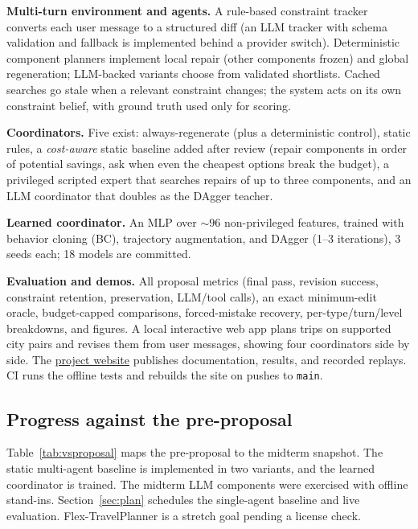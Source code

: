 \documentclass{article}
\begin{document}
\textbf{Multi-turn environment and agents.} A rule-based constraint tracker
converts each user message to a structured diff (an LLM tracker with schema
validation and fallback is implemented behind a provider switch).
Deterministic component planners implement local repair (other components
frozen) and global regeneration; LLM-backed variants choose from validated
shortlists. Cached searches go stale when a relevant constraint changes; the
system acts on its own constraint belief, with ground truth used only for
scoring.

\textbf{Coordinators.} Five exist: always-regenerate (plus a deterministic
control), static rules, a \emph{cost-aware} static baseline added after
review (repair components in order of potential savings, ask when even the
cheapest options break the budget), a privileged scripted expert that
searches repairs of up to three components, and an LLM coordinator that
doubles as the DAgger teacher.

\textbf{Learned coordinator.} An MLP over ${\sim}96$ non-privileged
features, trained with behavior cloning (BC), trajectory augmentation, and
DAgger (1--3 iterations), 3 seeds each; 18 models are committed.

\textbf{Evaluation and demos.} All proposal metrics (final pass, revision
success, constraint retention, preservation, LLM/tool calls), an exact
minimum-edit oracle, budget-capped comparisons, forced-mistake recovery,
per-type/turn/level breakdowns, and figures. A local interactive web app
plans trips on supported city pairs and revises them from user messages,
showing four coordinators side by side. The
\href{https://onetrickollie.github.io/taskflow-travel/}{project website}
publishes documentation, results, and recorded replays. CI runs the
offline tests and rebuilds the site on pushes to \texttt{main}.

\subsection{Progress against the pre-proposal}
Table~\ref{tab:vsproposal} maps the pre-proposal to the midterm snapshot.
The static multi-agent baseline is implemented in two variants, and the
learned coordinator is trained. The midterm LLM components were exercised
with offline stand-ins. Section~\ref{sec:plan} schedules the single-agent
baseline and live evaluation. Flex-TravelPlanner is a stretch goal pending
a license check.
\end{document}
